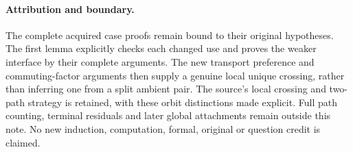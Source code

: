 \documentclass[11pt,a4paper]{article}
\begin{document}
\paragraph{Attribution and boundary.}
The complete acquired case proofs remain bound to
their original hypotheses. The first lemma explicitly
checks each changed use and proves the weaker
interface by their complete arguments. The new
transport preference and commuting-factor arguments
then supply a genuine local unique crossing, rather
than inferring one from a split ambient pair.
The source's local crossing and two-path strategy
is retained, with these orbit distinctions made
explicit. Full path counting, terminal residuals
and later global attachments remain outside this
note. No new induction, computation, formal,
original or question credit is claimed.
\end{document}
